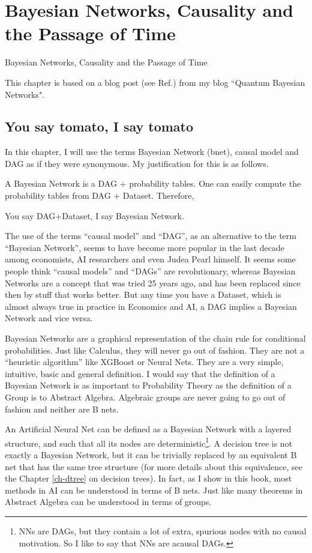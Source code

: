 \chapter*{Bayesian Networks, Causality and the
Passage of Time}
{Bayesian Networks, Causality and the
Passage of Time}

\label{ch-passage-time}

This chapter is based
on a blog post (see Ref.\cite{bnets-passage-time})
from my blog ``Quantum Bayesian Networks".


\section{You say tomato, I say tomato}
In this chapter, I will use the terms Bayesian Network
(bnet), causal model and DAG as if they were synonymous.
My justification for this is as follows.


 A Bayesian Network is a DAG + probability tables. One can easily compute the
 probability tables from DAG + Dataset. Therefore,

You say DAG+Dataset, I say Bayesian Network.

The use of the terms ``causal model” and ``DAG”, as an alternative to the term
``Bayesian Network”, seems to have become more popular in the last decade
among economists, AI researchers and even Judea Pearl himself. It seems some
people think ``causal models” and ``DAGs” are revolutionary, whereas Bayesian
Networks are a concept that was tried 25 years ago, and has been replaced
since then by stuff that works better. But any time you have a Dataset, which
is almost always true in practice in Economics and AI, a DAG implies a
Bayesian Network and vice versa.

Bayesian Networks are a graphical representation of the chain rule for
conditional probabilities. Just like Calculus, they will never go out of
fashion. They are not a ``heuristic algorithm” like XGBoost or Neural Nets.
They are a very simple, intuitive, basic and general definition. I would say
that the definition of a Bayesian Network is as important to Probability
Theory as the definition of a Group is to Abstract Algebra. Algebraic groups
are never going to go out of fashion and neither are B nets.

An Artificial Neural Net can be defined as a Bayesian Network with a layered
structure, and such that all its nodes are deterministic\footnote{NNs
are DAGs, but they contain a lot of extra,
spurious nodes with no causal motivation. So I like to
say that NNs are acausal DAGs.}. A decision tree
is not exactly a Bayesian Network, but it can be trivially replaced by an
equivalent B net that has the same tree structure (for more details about
this equivalence, see the Chapter \ref{ch-dtree} on decision trees).
In fact, as I show in this book, most methods in AI can be
understood in terms of B nets. Just like many theorems in Abstract Algebra
can be understood in terms of groups.



